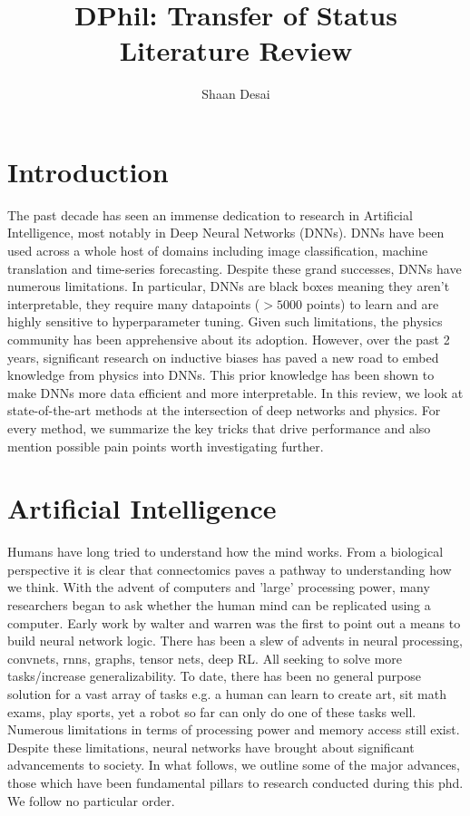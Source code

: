 \documentclass{article}
\title{DPhil: Transfer of Status Literature Review}
\author{Shaan Desai }
\begin{document}
\maketitle


\tableofcontents
\section{Introduction}

The past decade has seen an immense dedication to research in Artificial Intelligence, most notably in Deep Neural Networks (DNNs). DNNs have been used across a whole host of domains including image classification, machine translation and time-series forecasting. Despite these grand successes, DNNs have numerous limitations. In particular, DNNs are black boxes meaning they aren't interpretable, they require many datapoints ($>5000$ points) to learn and are highly sensitive to hyperparameter tuning. Given such limitations, the physics community has been apprehensive about its adoption. However, over the past 2 years, significant research on inductive biases has paved a new road to embed knowledge from physics into DNNs. This prior knowledge has been shown to make DNNs more data efficient and more interpretable. In this review, we look at state-of-the-art methods at the intersection of deep networks and physics. For every method, we summarize the key tricks that drive performance and also mention possible pain points worth investigating further.


\section{Artificial Intelligence}

Humans have long tried to understand how the mind works. From a biological perspective it is clear that connectomics paves a pathway to understanding how we think. With the advent of computers and 'large' processing power, many researchers began to ask whether the human mind can be replicated using a computer. Early work by walter and warren was the first to point out a means to build neural network logic. There has been a slew of advents in neural processing, convnets, rnns, graphs, tensor nets, deep RL. All seeking to solve more tasks/increase generalizability. To date, there has been no general purpose solution for a vast array of tasks e.g. a human can learn to create art, sit math exams, play sports, yet a robot so far can only do one of these tasks well. Numerous limitations in terms of processing power and memory access still exist. Despite these limitations, neural networks have brought about significant advancements to society. In what follows, we outline some of the major advances, those which have been fundamental pillars to research conducted during this phd. We follow no particular order.
\end{document}
